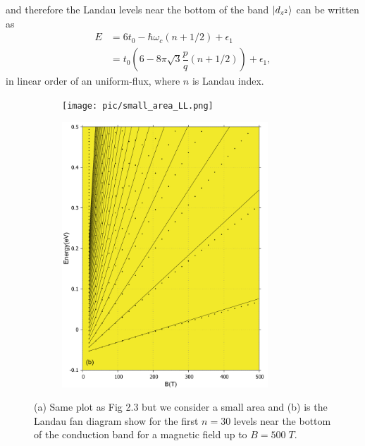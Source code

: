 \documentclass{report}
\newcommand{\f}[2]{\dfrac{#1}{#2}}
\begin{document}
and therefore the Landau levels near the bottom of the band $\ket{d_{z^{2}}}$ can be written as
\begin{equation}
	\begin{aligned}
		E
		 & = 6 t_{0} - \hbar \omega_{c} (n + 1 /2) + \epsilon_{1}                    \\
		 & = t_{0} \left(6 - 8\pi\sqrt{3} \f{p}{q}( n + 1 /2)\right) + \epsilon_{1},
	\end{aligned}
\end{equation}
in linear order of an uniform-flux, where $n$ is Landau index.
\begin{figure}[htb]
	\centering
	\begin{subfigure}[b]{0.49\textwidth}
		\centering
		{\texttt{[image: pic/small\_area\_LL.png]}}
	\end{subfigure}
	\begin{subfigure}[b]{0.49\textwidth}
		\centering
		\includegraphics[width=0.85\textwidth,height=1.2\linewidth]{pic/landaulevel_h0_q_797_final.pdf}
	\end{subfigure}
	\caption{
		(a) Same plot as Fig 2.3 but we consider a small area and (b) is the Landau fan diagram show for the first $n = 30$ levels near the bottom of the conduction band for a magnetic field up to $B = 500\; T$.
	}
\end{figure}
\end{document}
